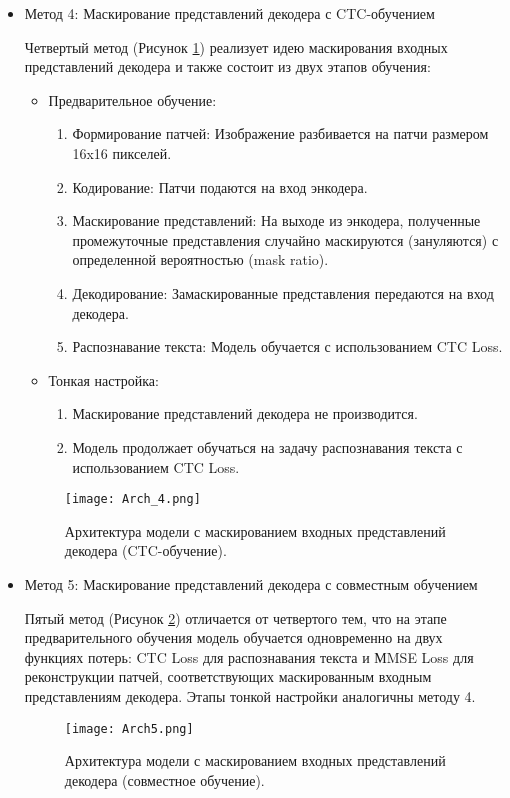 \begin{itemize}

   \item Метод 4: Маскирование представлений декодера с CTC-обучением
   

   Четвертый метод (Рисунок \ref{6}) реализует идею маскирования входных представлений декодера и также состоит из двух этапов обучения:
   \begin{itemize}
     \item Предварительное обучение:
     \begin{enumerate}
        \item Формирование патчей: Изображение разбивается на патчи размером 16x16 пикселей.
        \item Кодирование: Патчи подаются на вход энкодера.
        \item Маскирование представлений: На выходе из энкодера, полученные промежуточные представления случайно маскируются (зануляются) с определенной вероятностью (mask ratio).
        \item Декодирование: Замаскированные представления передаются на вход декодера.
        \item Распознавание текста: Модель обучается с использованием CTC Loss.
     \end{enumerate}
     \item Тонкая настройка:
     \begin{enumerate}
        \item Маскирование представлений декодера не производится.
        \item Модель продолжает обучаться на задачу распознавания текста с использованием CTC Loss.
     \end{enumerate}
   \end{itemize}
   \begin{figure}[H]
     \centering
     \texttt{[image: Arch\_4.png]}
     \caption{Архитектура модели с маскированием входных представлений декодера (CTC-обучение).}
     \label{6} 
   \end{figure}

   \item Метод 5: Маскирование представлений декодера с совместным обучением
   
   Пятый метод (Рисунок \ref{7}) отличается от четвертого тем, что на этапе предварительного обучения модель обучается одновременно на двух функциях потерь: CTC Loss для распознавания текста и МMSE Loss для реконструкции патчей, соответствующих маскированным входным представлениям декодера. Этапы тонкой настройки аналогичны методу 4.

   \begin{figure}[H]
     \centering
     \texttt{[image: Arch5.png]}
     \caption{Архитектура модели с маскированием входных представлений декодера (совместное обучение).}
     \label{7} 
   \end{figure}

\end{itemize}


